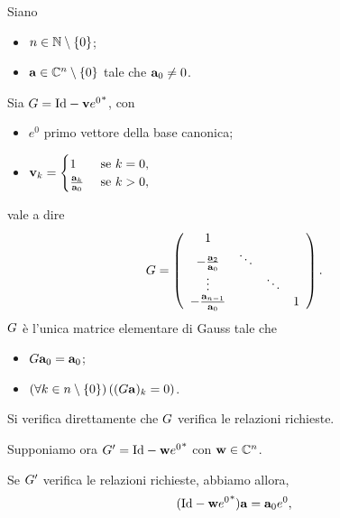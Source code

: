 \begin{Theorem}
  Siano
  \begin{itemize}
    \item $n \in \mathbb{N} \setminus \lbrace 0 \rbrace$;
    \item $\mathbf{a} \in \mathbb{C}^n \setminus \lbrace 0 \rbrace$ tale che
      $\mathbf{a}_0 \neq 0$.
  \end{itemize}
  Sia
  $\GaussElementaryMatrix
  = \Identity - \Vector\HermitianTransposed{\CanonicalBase^0}$,
  con
  \begin{itemize}
    \item $e^0$ primo vettore della base canonica;
    \item $\mathbf{v}_k =
            \begin{cases}
              1&\text{ se }k = 0,\\
              \frac{\mathbf{a}_k}{\mathbf{a}_0}&\text{ se }k > 0,
          \end{cases}$
  \end{itemize}
  vale a dire
  \[
    G =
    \left (
      \begin{array}{cccc}
        1 &&&\\
        - \frac{\mathbf{a}_{2}}{\mathbf{a}_0}         & \ddots & &\\
        \vdots            & & \ddots &  \\
        - \frac{\mathbf{a}_{n - 1}}{\mathbf{a}_0}   &   & & 1 \\
      \end{array}
    \right ).
  \]
  $G$ \`e l'unica matrice elementare di Gauss tale che
  \begin{itemize}
    \item $G\mathbf{a}_0 = \mathbf{a}_0$;
    \item $\left ( \forall k \in n \setminus \lbrace 0 \rbrace \right ) \left ( (G\mathbf{a})_k = 0 \right )$.
  \end{itemize}
\end{Theorem}
\Proof Si verifica direttamente che $G$ verifica le relazioni richieste.
\par Supponiamo ora
$\GaussElementaryMatrix' = \Identity - \VarVector \HermitianTransposed{\CanonicalBase^0}$
con $\mathbf{w} \in \mathbb{C}^n$.
\par Se $G'$ verifica le relazioni richieste, abbiamo allora,
\[
  (\Identity - \VarVector \HermitianTransposed{\CanonicalBase^0})\VarVarVector
  = \VarVarVector_0 \CanonicalBase^0,
\]

